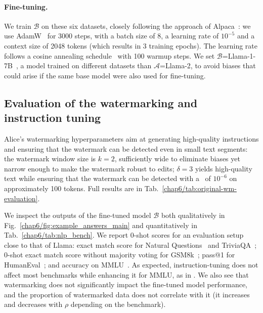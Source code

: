 \paragraph*{Fine-tuning.} 
We train $\mathcal{B}$ on these six datasets, closely following the approach of Alpaca~\citep{alpaca}:
we use AdamW~\citep{loshchilov2017decoupled} for 3000 steps, with a batch size of 8, a learning rate of $10^{-5}$ and a context size of 2048 tokens (which results in 3 training epochs).
The learning rate follows a cosine annealing schedule~\citep{loshchilov2017sgdr} with 100 warmup steps.
We set $\mathcal{B}$=Llama-1-7B~\citep{touvron2023llama}, a model trained on different datasets than $\mathcal{A}$=Llama-2, to avoid biases that could arise if the same base model were also used for fine-tuning.



\subsection{Evaluation of the watermarking and instruction tuning}\label{chap6/sec:quality-inspection}


Alice's watermarking hyperparameters aim 
at generating high-quality instructions and ensuring that the watermark can be detected even in small text segments:
the watermark window size is $k=2$, sufficiently wide to eliminate biases yet narrow enough to make the watermark robust to edits;
$\delta=3$ yields high-quality text while ensuring that the watermark can be detected with a \pval\ of $10^{-6}$ on approximately 100 tokens.
Full results are in Tab.~\ref{chap6/tab:original-wm-evaluation}.


We inspect the outputs of the fine-tuned model $\mathcal{B}$ both qualitatively in Fig.~\ref{chap6/fig:example_answers_main} and quantitatively in Tab.~\ref{chap6/tab:nlp_bench}.
We report 0-shot scores for an evaluation setup close to that of Llama: exact match score for Natural Questions~\citep{kwiatkowski2019natural} and TriviaQA~\citep{joshi2017triviaqa}; 0-shot exact match score without majority voting for GSM8k~\citep{cobbe2021training}; pass@1 for HumanEval~\citep{chen2021Evaluating}; and accuracy on MMLU~\citep{hendrycks2020measuring}.
As expected, instruction-tuning does not affect most benchmarks while enhancing it for MMLU, as in \citep{dettmers2023qlora}.
We also see that watermarking does not significantly impact the fine-tuned model performance, and the proportion of watermarked data does not correlate with it (it increases and decreases with $\rho$ depending on the benchmark).


